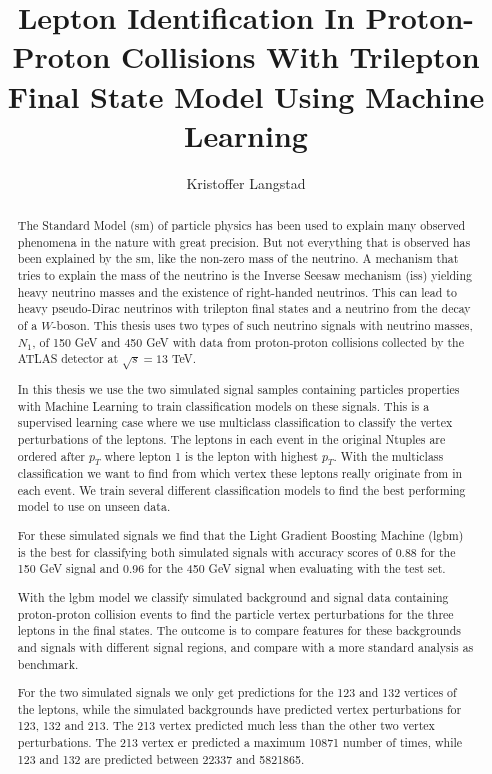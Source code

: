 \documentclass[a4paper, american, 12pt]{report}
\title{Lepton Identification In Proton-Proton Collisions With Trilepton Final State Model Using Machine Learning}
\author{Kristoffer Langstad}
\begin{document}
	\duoforside[program={Computational Science: Physics}, dept={Department of Physics}, long]


	\begin{abstract}
		The Standard Model (\acrshort{sm}) of particle physics has been used to explain many observed phenomena in the nature with great precision. But not everything that is observed has been explained by the \acrshort{sm}, like the non-zero mass of the neutrino. A mechanism that tries to explain the mass of the neutrino is the Inverse Seesaw mechanism (\acrshort{iss}) yielding heavy neutrino masses and the existence of right-handed neutrinos. This can lead to heavy pseudo-Dirac neutrinos with trilepton final states and a neutrino from the decay of a $W$-boson. This thesis uses two types of such neutrino signals with neutrino masses, $N_1$, of 150 GeV and 450 GeV with data from proton-proton collisions collected by the ATLAS detector at $\sqrt{s}=13$ TeV.
		
		In this thesis we use the two simulated signal samples containing particles properties with Machine Learning to train classification models on these signals. This is a supervised learning case where we use multiclass classification to classify the vertex perturbations of the leptons. The leptons in each event in the original Ntuples are ordered after $p_T$ where lepton 1 is the lepton with highest $p_T$. With the multiclass classification we want to find from which vertex these leptons really originate from in each event. We train several different classification models to find the best performing model to use on unseen data.
		 
		For these simulated signals we find that the Light Gradient Boosting Machine (\acrshort{lgbm}) is the best for classifying both simulated signals with accuracy scores of 0.88 for the 150 GeV signal and 0.96 for the 450 GeV signal when evaluating with the test set. 
		
		With the \acrshort{lgbm} model we classify simulated background and signal data containing proton-proton collision events to find the particle vertex perturbations for the three leptons in the final states. The outcome is to compare features for these backgrounds and signals with different signal regions, and compare with a more standard analysis as benchmark. 
		
		For the two simulated signals we only get predictions for the 123 and 132 vertices of the leptons, while the simulated backgrounds have predicted vertex perturbations for 123, 132 and 213. The 213 vertex predicted much less than the other two vertex perturbations. The 213 vertex er predicted a maximum 10871 number of times, while 123 and 132 are predicted between 22337 and 5821865.
		

\end{abstract}
\end{document}
